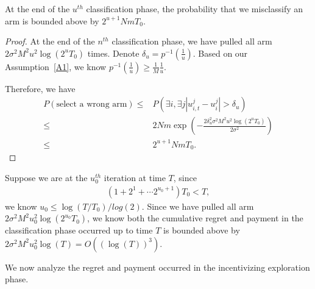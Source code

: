 \begin{lemma}
At the end of the $u^{th}$ classification phase, the probability that we misclassify an arm is bounded above by $2^{u+1} Nm T_0$.
\end{lemma}

\begin{proof}
At the end of the $n^{th}$ classification phase, we have pulled all arm $2\sigma^2 M^2 u^2 \log(2^u T_0)$ times. Denote $\delta_u = p^{-1}\left(\frac{1}{u}\right)$. Based on our Assumption~\ref{A1}, we know $p^{-1}(\frac{1}{u})\geq \frac{1}{M}\frac{1}{u}$. 

Therefore, we have
\begin{align}
P(\text{select a wrong arm})\leq & P(\exists i, \exists j |u_{i,t}^{j}-u_{i}^{j}|>\delta_u) \nonumber \\
\leq & 2Nm\exp\left(-\frac{2 \delta_u^2 \sigma^2 M^2 u^2\log(2^u T_0)}{2\sigma^2}\right) \nonumber  \\
\leq & 2^{u+1}Nm T_0. \nonumber
\end{align}

\end{proof}

Suppose we are at the $u_0^{th}$ iteration at time $T$, since
\begin{align}
(1+2^1 + \cdots 2^{u_0+1})T_0 <T, \nonumber 
\end{align}
we know $u_0 \leq \log(T/T_0) / log(2)$. Since we have pulled all arm $2\sigma^2 M^2 u_0^2 \log(2^{u_0}T_0)$, we know both the cumulative regret and payment in the classification phase occurred up to time $T$ is bounded above by $2\sigma^2 M^2 u_0^2 \log(T)=O((\log(T))^3)$.



We now analyze the regret and payment occurred in the incentivizing exploration phase.

